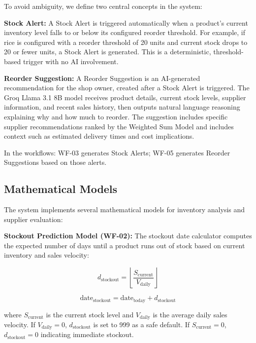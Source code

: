 \documentclass[journal]{IEEEtran}
\begin{document}
To avoid ambiguity, we define two central concepts in the system:

\textbf{Stock Alert:} A Stock Alert is triggered automatically when a product's current inventory level falls to or below its configured reorder threshold. For example, if rice is configured with a reorder threshold of 20 units and current stock drops to 20 or fewer units, a Stock Alert is generated. This is a deterministic, threshold-based trigger with no AI involvement.

\textbf{Reorder Suggestion:} A Reorder Suggestion is an AI-generated recommendation for the shop owner, created after a Stock Alert is triggered. The Groq Llama 3.1 8B model receives product details, current stock levels, supplier information, and recent sales history, then outputs natural language reasoning explaining why and how much to reorder. The suggestion includes specific supplier recommendations ranked by the Weighted Sum Model and includes context such as estimated delivery times and cost implications.

In the workflows: WF-03 generates Stock Alerts; WF-05 generates Reorder Suggestions based on those alerts.

\subsection{Mathematical Models}

The system implements several mathematical models for inventory analysis and supplier evaluation:

\textbf{Stockout Prediction Model (WF-02):}
The stockout date calculator computes the expected number of days until a product runs out of stock based on current inventory and sales velocity:

\begin{equation}
\label{eq:stockout_days}
d_{\text{stockout}} = \left\lfloor \frac{S_{\text{current}}}{V_{\text{daily}}} \right\rfloor
\end{equation}

\begin{equation}
\label{eq:stockout_date}
\text{date}_{\text{stockout}} = \text{date}_{\text{today}} + d_{\text{stockout}}
\end{equation}

where $S_{\text{current}}$ is the current stock level and $V_{\text{daily}}$ is the average daily sales velocity. If $V_{\text{daily}} = 0$, $d_{\text{stockout}}$ is set to 999 as a safe default. If $S_{\text{current}} = 0$, $d_{\text{stockout}} = 0$ indicating immediate stockout.
\end{document}
